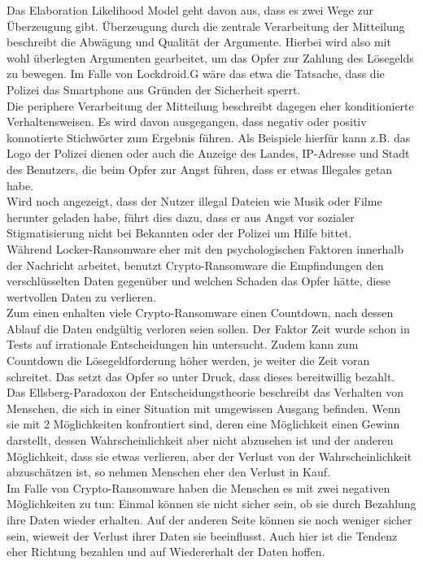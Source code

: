 Das Elaboration Likelihood Model geht davon aus, dass es zwei Wege zur Überzeugung gibt. Überzeugung durch die zentrale Verarbeitung der Mitteilung beschreibt die Abwägung und Qualität der Argumente. Hierbei wird also mit wohl überlegten Argumenten gearbeitet, um das Opfer zur Zahlung des Lösegelds zu bewegen. Im Falle von \glqq Lockdroid.G\grqq{} wäre das etwa die Tatsache, dass die Polizei das Smartphone \glqq aus Gründen der Sicherheit\grqq{} sperrt.\\
Die periphere Verarbeitung der Mitteilung beschreibt dagegen eher konditionierte Verhaltensweisen. Es wird davon ausgegangen, dass negativ oder positiv konnotierte Stichwörter zum Ergebnis führen. Als Beispiele hierfür kann z.B. das Logo der Polizei dienen oder auch die Anzeige des Landes, IP-Adresse und Stadt des Benutzers, die beim Opfer zur Angst führen, dass er etwas Illegales getan habe. \\

Wird noch angezeigt, dass der Nutzer illegal Dateien wie Musik oder Filme herunter geladen habe, führt dies dazu, dass er aus Angst vor sozialer Stigmatisierung nicht bei Bekannten oder der Polizei um Hilfe bittet.\\

Während Locker-Ransomware eher mit den psychologischen Faktoren innerhalb der Nachricht arbeitet, benutzt Crypto-Ransomware die Empfindungen den verschlüsselten Daten gegenüber und welchen Schaden das Opfer hätte, diese wertvollen Daten zu verlieren.\\

Zum einen enhalten viele Crypto-Ransomware einen Countdown, nach dessen Ablauf die Daten endgültig verloren seien sollen. Der Faktor Zeit wurde schon in Tests auf irrationale Entscheidungen hin untersucht. Zudem kann zum Countdown die Lösegeldforderung höher werden, je weiter die Zeit voran schreitet. Das setzt das Opfer so unter Druck, dass dieses bereitwillig bezahlt.\\
Das Ellsberg-Paradoxon der Entscheidungstheorie beschreibt das Verhalten von Menschen, die sich in einer Situation mit umgewissen Ausgang befinden. Wenn sie mit 2 Möglichkeiten konfrontiert sind, deren eine Möglichkeit einen Gewinn darstellt, dessen Wahrscheinlichkeit aber nicht abzusehen ist und der anderen Möglichkeit, dass sie etwas verlieren, aber der Verlust von der Wahrscheinlichkeit abzuschätzen ist, so nehmen Menschen eher den Verlust in Kauf.\\
Im Falle von Crypto-Ransomware haben die Menschen es mit zwei negativen Möglichkeiten zu tun: Einmal können sie nicht sicher sein, ob sie durch Bezahlung ihre Daten wieder erhalten. Auf der anderen Seite können sie noch weniger sicher sein, wieweit der Verlust ihrer Daten sie beeinflusst. Auch hier ist die Tendenz eher Richtung bezahlen und auf Wiedererhalt der Daten hoffen.

